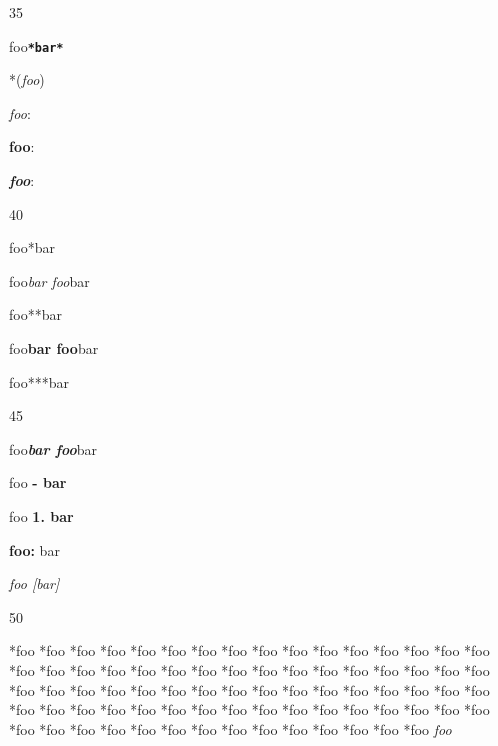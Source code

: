 35

foo\textbf{\texttt{*bar*}}

*(\emph{foo})

\emph{foo}:

\textbf{foo}:

\textbf{\emph{foo}}:

40

foo*bar

foo\emph{bar foo}bar

foo**bar

foo\textbf{bar foo}bar

foo***bar

45

foo\textbf{\emph{bar foo}}bar

foo \textbf{- bar}

foo \textbf{1. bar}

\textbf{foo:} bar

\emph{foo [bar]}

50

*foo
*foo
*foo
*foo
*foo
*foo
*foo
*foo
*foo
*foo
*foo
*foo
*foo
*foo
*foo
*foo
*foo
*foo
*foo
*foo
*foo
*foo
*foo
*foo
*foo
*foo
*foo
*foo
*foo
*foo
*foo
*foo
*foo
*foo
*foo
*foo
*foo
*foo
*foo
*foo
*foo
*foo
*foo
*foo
*foo
*foo
*foo
*foo
*foo
*foo
*foo
*foo
*foo
*foo
*foo
*foo
*foo
*foo
*foo
*foo
*foo
*foo
*foo
*foo
*foo
*foo
*foo
*foo
*foo
*foo
*foo
*foo
*foo
*foo
*foo
*foo
*foo
*foo
\emph{foo}



